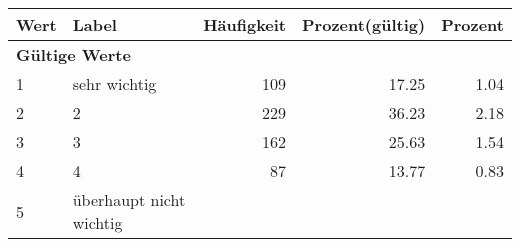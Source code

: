      \begin{longtable}{lXrrr}
     \toprule
     \textbf{Wert} & \textbf{Label} & \textbf{Häufigkeit} & \textbf{Prozent(gültig)} & \textbf{Prozent} \\
     \endhead
     \midrule
     \multicolumn{5}{l}{\textbf{Gültige Werte}}\\

     1 &
     \multicolumn{1}{X}{ sehr wichtig   } &


       \num{109} &
       \num[round-mode=places,round-precision=2]{17.25} &
         \num[round-mode=places,round-precision=2]{1.04} \\

     2 &
     \multicolumn{1}{X}{ 2   } &


       \num{229} &
       \num[round-mode=places,round-precision=2]{36.23} &
         \num[round-mode=places,round-precision=2]{2.18} \\

     3 &
     \multicolumn{1}{X}{ 3   } &


       \num{162} &
       \num[round-mode=places,round-precision=2]{25.63} &
         \num[round-mode=places,round-precision=2]{1.54} \\

     4 &
     \multicolumn{1}{X}{ 4   } &


       \num{87} &
       \num[round-mode=places,round-precision=2]{13.77} &
         \num[round-mode=places,round-precision=2]{0.83} \\

     5 &
     \multicolumn{1}{X}{ überhaupt nicht wichtig   } &



\end{longtable}
